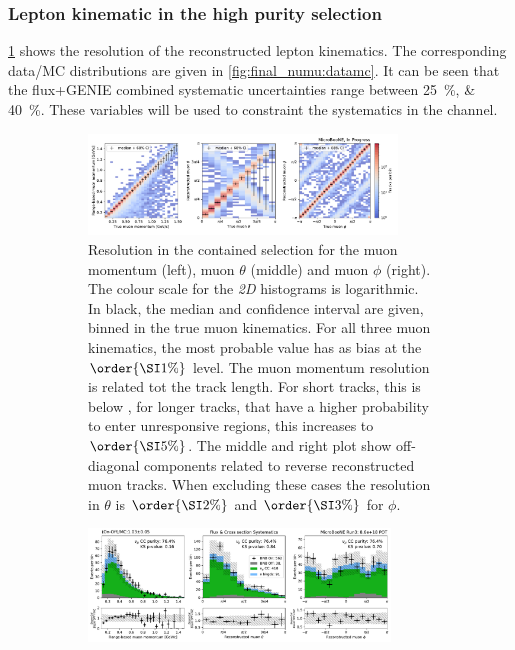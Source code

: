 \subsubsection{Lepton kinematic in the high purity selection}
\cref{fig:final_numu:reso} shows the resolution of the reconstructed lepton kinematics.
The corresponding data/MC distributions are given in \cref{fig:final_numu:datamc}. It can be seen that the flux+GENIE combined systematic uncertainties range between \SIlist{25;40}{\%}. These variables will be used to constraint the systematics in the \nuecc channel. 

\begin{figure}[htb] 
\begin{center}
    \begin{subfigure}{\textwidth}
    \centering
    \includegraphics[width=0.9\textwidth]{Inclusive/Images/thesis_muon_resolution.pdf}
    \caption{\label{fig:final_numu:reso} Resolution in the contained \numucc selection for the muon momentum (left), muon $\theta$ (middle) and muon $\phi$ (right). The colour scale for the \textit{2D} histograms is logarithmic. In black, the median and  confidence interval are given, binned in the true muon kinematics. For all three muon kinematics, the most probable value has as bias at the $\order{\pct{1}}$ level. The muon momentum resolution is related tot the track length. For short tracks, this is below , for longer tracks, that have a higher probability to enter unresponsive regions, this increases to $\order{\pct{5}}$. The middle and right plot show off-diagonal components related to reverse reconstructed muon tracks. When excluding these cases the resolution in $\theta$ is $\order{\pct{2}}$ and $\order{\pct{3}}$ for $\phi$.\\}
    \end{subfigure}
    \begin{subfigure}{\textwidth}
    \centering
    \includegraphics[width=0.88\textwidth]{Inclusive/Images/thesis_muon_kinematics_run3.pdf}

\end{subfigure}
\end{center}
\end{figure}
